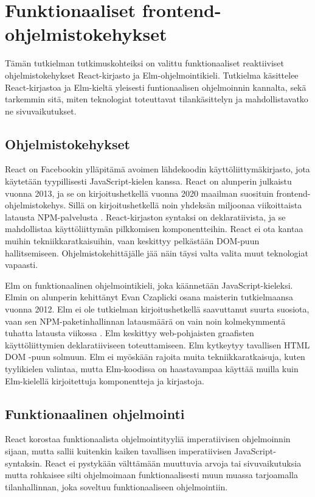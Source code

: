 \chapter{Funktionaaliset frontend-ohjelmistokehykset}
Tämän tutkielman tutkimuskohteiksi on valittu funktionaaliset reaktiiviset ohjelmistokehykset React-kirjasto ja
Elm-ohjelmointikieli. Tutkielma käsittelee React-kirjastoa ja Elm-kieltä yleisesti funtionaalisen ohjelmoinnin kannalta,
sekä tarkemmin sitä, miten teknologiat toteuttavat tilankäsittelyn ja mahdollistavatko ne sivuvaikutukset.

\section{Ohjelmistokehykset}
React on Facebookin ylläpitämä avoimen lähdekoodin käyttöliittymäkirjasto, jota käytetään tyypillisesti
JavaScript-kielen kanssa. React on alunperin julkaistu vuonna 2013, ja se on kirjoitushetkellä vuonna 2020 maailman
suosituin frontend-ohjelmistokehys. Sillä on kirjoitushetkellä noin yhdeksän miljoonaa viikoittaista latausta
NPM-palvelusta \cite{npmtrends}. React-kirjaston syntaksi on deklaratiivista, ja se mahdollistaa käyttöliittymän
pilkkomisen komponentteihin. React ei ota kantaa muihin tekniikkaratkaisuihin, vaan keskittyy pelkästään DOM-puun
hallitsemiseen. Ohjelmistokehittäjälle jää näin täysi valta valita muut teknologiat vapaasti. \cite{reactjs}

Elm on funktionaalinen ohjelmointikieli, joka käännetään JavaScript-kieleksi. Elmin on alunperin kehittänyt Evan
Czaplicki osana maisterin tutkielmaansa vuonna 2012. Elm ei ole tutkielman kirjoitushetkellä saavuttanut suurta
suosiota, vaan sen NPM-paketinhallinnan latausmäärä on vain noin kolmekymmentä tuhatta latausta viikossa
\cite{npmtrends}. Elm keskittyy web-pohjaisten graafisten käyttöliittymien deklaratiiviseen toteuttamiseen. Elm
kytkeytyy tavallisen HTML DOM -puun solmuun. Elm ei myöskään rajoita muita tekniikkaratkaisuja, kuten tyylikielen
valintaa, mutta Elm-koodissa on haastavampaa käyttää muilla kuin Elm-kielellä kirjoitettuja komponentteja ja kirjastoja.
\cite{elmlang}

\section{Funktionaalinen ohjelmointi}
React korostaa funktionaalista ohjelmointityyliä imperatiivisen ohjelmoinnin sijaan, mutta sallii kuitenkin kaiken
tavallisen imperatiivisen JavaScript-syntaksin. React ei pystykään välttämään muuttuvia arvoja tai sivuvaikutuksia mutta
rohkaisee silti ohjelmoimaan funktionaalisesti muun muassa tarjoamalla tilanhallinnan, joka soveltuu funktionaaliseen
ohjelmointiin. \cite{reactjs}

